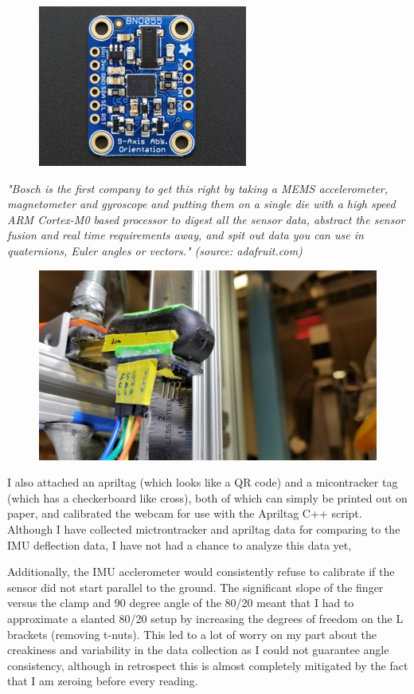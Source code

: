 \documentclass[12pt]{article}
\begin{document}
\begin{figure}[H]
\centering
\includegraphics[width=.5\textwidth]{images/setup/bno055.png}
\end{figure}

\textit{"Bosch is the first company to get this right by taking a MEMS accelerometer, magnetometer and
    gyroscope and putting them on a single die with a high speed ARM Cortex-M0 based processor to digest
    all the sensor data, abstract the sensor fusion and real time requirements away, and spit out data
you can use in quaternions, Euler angles or vectors." (source: adafruit.com)}

\begin{figure}[H]
\centering
\includegraphics[width=.5\textwidth]{images/setup/IMU.jpg}
\end{figure}

I also attached an apriltag (which looks like a QR code) and a micontracker tag (which has a
checkerboard like cross), both of which can simply be printed out on paper, and calibrated the
webcam for use with the Apriltag C++ script. Although I have collected mictrontracker and apriltag
data for comparing to the IMU deflection data, I have not had a chance to analyze this data yet,

Additionally, the IMU acclerometer would consistently refuse to calibrate if the sensor did not
start parallel to the ground. The significant slope of the finger versus the clamp and 90 degree
angle of the 80/20 meant that I had to approximate a slanted 80/20 setup by increasing the degrees
of freedom on the L brackets (removing t-nuts). This led to a lot of worry on my part about the
creakiness and variability in the data collection as I could not guarantee angle consistency,
although in retrospect this is almost completely mitigated by the fact that I am zeroing before
every reading. 
\end{document}
